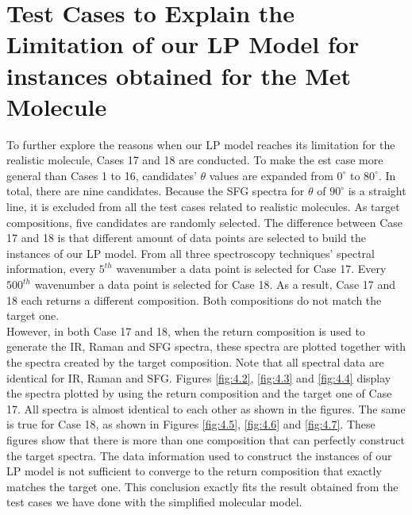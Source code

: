 \section{Test Cases to Explain the Limitation of our LP Model for instances obtained for the Met Molecule}

To further explore the reasons when our  LP model reaches its limitation for the realistic molecule, Cases 17 and 18 are conducted. To make the est case more general than Cases 1 to 16, candidates' $\theta$ values are expanded from $0^{\circ}$ to $80^{\circ}$. In total, there are nine candidates. Because the SFG spectra for $\theta$ of $90^{\circ}$ is a straight line, it is excluded from all the test cases related to realistic molecules. As target compositions, five candidates are randomly selected. The difference between Case 17 and 18 is that different amount of data points are selected to build the instances of our LP model. From all three spectroscopy techniques' spectral information, every $5^{th}$ wavenumber a data point is selected for Case 17. Every $500^{th}$ wavenumber a data point is selected for Case 18. As a result, Case 17 and 18 each returns a different composition. Both compositions do not match the target one. \\

However, in both Case 17 and 18, when the return composition is used to generate the IR, Raman and SFG spectra, these spectra are plotted together with the spectra created by the target composition. Note that all spectral data are identical for IR, Raman and SFG. Figures \ref{fig:4.2}, \ref{fig:4.3} and \ref{fig:4.4} display the spectra plotted by using the return composition and the target one of Case 17. All spectra is almost identical to each other as shown in the figures. The same is true for Case 18, as shown in Figures \ref{fig:4.5}, \ref{fig:4.6} and \ref{fig:4.7}. These figures show that there is more than one composition that can perfectly construct the target spectra. The data information used to construct the instances of our LP model is not sufficient to converge to the return composition that exactly matches the target one. This conclusion exactly fits the result obtained from the test cases we have done with the simplified molecular model.\\

